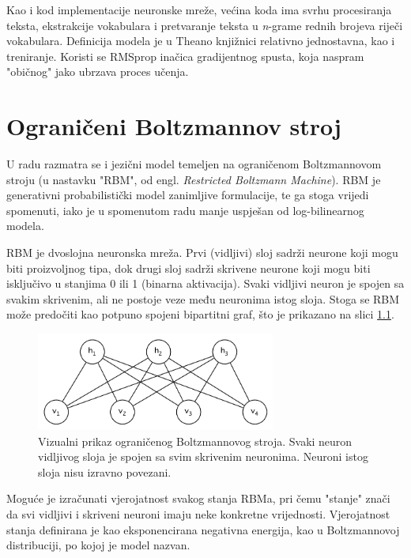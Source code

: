\documentclass[times, utf8, diplomski, numeric]{fer}
\begin{document}
Kao i kod implementacije neuronske mreže, većina koda ima svrhu procesiranja teksta, ekstrakcije vokabulara i pretvaranje teksta u \textit{n}-grame rednih brojeva riječi vokabulara. Definicija modela je u Theano knjižnici relativno jednostavna, kao i treniranje. Koristi se RMSprop inačica gradijentnog spusta, koja naspram "običnog" jako ubrzava proces učenja.

\chapter{Ograničeni Boltzmannov stroj}

U radu \cite{MnihH07} razmatra se i jezični model temeljen na ograničenom Boltzmannovom stroju (u nastavku "RBM", od engl. \textit{Restricted Boltzmann Machine}). RBM je generativni probabilistički model \cite{hinton_poe} zanimljive formulacije, te ga stoga vrijedi spomenuti, iako je u spomenutom radu manje uspješan od log-bilinearnog modela.

RBM je dvoslojna neuronska mreža. Prvi (vidljivi) sloj sadrži neurone koji mogu biti proizvoljnog tipa, dok drugi sloj sadrži skrivene neurone koji mogu biti isključivo u stanjima 0 ili 1 (binarna aktivacija). Svaki vidljivi neuron je spojen sa svakim skrivenim, ali ne postoje veze među neuronima istog sloja. Stoga se RBM može predočiti kao potpuno spojeni bipartitni graf, što je prikazano na slici \ref{fig:rbm}.

\begin{figure}[!htb]
\centering
\includegraphics[width=0.7\textwidth]{fig/rbm_ex1.pdf}
\caption{Vizualni prikaz ograničenog Boltzmannovog stroja. Svaki neuron vidljivog sloja je spojen sa svim skrivenim neuronima. Neuroni istog sloja nisu izravno povezani.}
\label{fig:rbm}
\end{figure}

Moguće je izračunati vjerojatnost svakog stanja RBMa, pri čemu "stanje" znači da svi vidljivi i skriveni neuroni imaju neke konkretne vrijednosti. Vjerojatnost stanja definirana je kao eksponencirana negativna energija, kao u Boltzmannovoj distribuciji, po kojoj je model nazvan.
\end{document}
